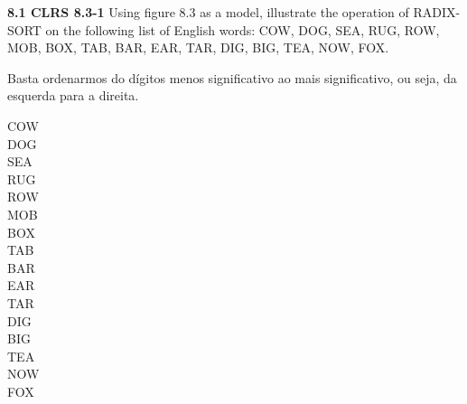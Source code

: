 
\noindent \textbf{8.1 CLRS 8.3-1} Using figure 8.3 as a model, illustrate the operation of RADIX-SORT on the following list of English words: COW, DOG, SEA, RUG, ROW, MOB, BOX, TAB, BAR, EAR, TAR, DIG, BIG, TEA, NOW, FOX.

Basta ordenarmos do dígitos menos significativo ao mais significativo, ou seja, da esquerda para a direita.

\noindent COW    \\
DOG    \\
SEA    \\
RUG    \\
ROW    \\
MOB    \\
BOX    \\
TAB    \\
BAR    \\
EAR    \\
TAR    \\
DIG    \\
BIG    \\
TEA    \\
NOW    \\
FOX    \\[12pt]